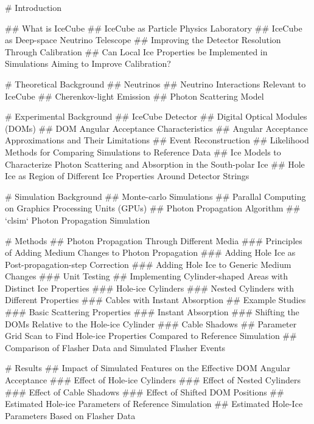 
\setcounter{tocdepth}{2}
\tableofcontents

# Introduction

## What is IceCube
## IceCube as Particle Physics Laboratory
## IceCube as Deep-space Neutrino Telescope
## Improving the Detector Resolution Through Calibration
## Can Local Ice Properties be Implemented in Simulations Aiming to Improve Calibration?

# Theoretical Background
## Neutrinos
## Neutrino Interactions Relevant to IceCube
## Cherenkov-light Emission
## Photon Scattering Model

# Experimental Background
## IceCube Detector
## Digital Optical Modules (DOMs)
## DOM Angular Acceptance Characteristics
## Angular Acceptance Approximations and Their Limitations
## Event Reconstruction
## Likelihood Methods for Comparing Simulations to Reference Data
## Ice Models to Characterize Photon Scattering and Absorption in the South-polar Ice
## Hole Ice as Region of Different Ice Properties Around Detector Strings

# Simulation Background
## Monte-carlo Simulations
## Parallal Computing on Graphics Processing Units (GPUs)
## Photon Propagation Algorithm
## `clsim` Photon Propagation Simulation

# Methods
## Photon Propagation Through Different Media
### Principles of Adding Medium Changes to Photon Propagation
### Adding Hole Ice as Post-propagation-step Correction
### Adding Hole Ice to Generic Medium Changes
### Unit Testing
## Implementing Cylinder-shaped Areas with Distinct Ice Properties
### Hole-ice Cylinders
### Nested Cylinders with Different Properties
### Cables with Instant Absorption
## Example Studies
### Basic Scattering Properties
### Instant Absorption
### Shifting the DOMs Relative to the Hole-ice Cylinder
### Cable Shadows
## Parameter Grid Scan to Find Hole-ice Properties Compared to Reference Simulation
## Comparison of Flasher Data and Simulated Flasher Events

# Results
## Impact of Simulated Features on the Effective DOM Angular Acceptance
### Effect of Hole-ice Cylinders
### Effect of Nested Cylinders
### Effect of Cable Shadows
### Effect of Shifted DOM Positions
## Estimated Hole-ice Parameters of Reference Simulation
## Estimated Hole-Ice Parameters Based on Flasher Data

